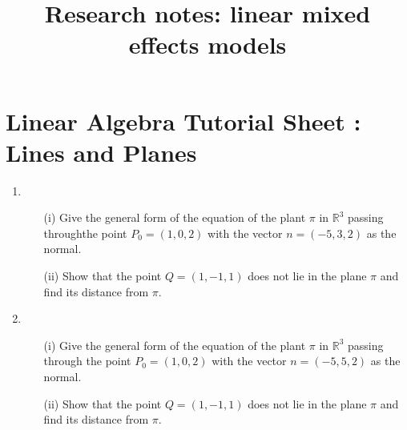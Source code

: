 \documentclass[12pt, a4paper]{report}
\title{Research notes: linear mixed effects models}
\author{ } \date{ }
\theoremstyle{plain}
\theoremstyle{definition}
\theoremstyle{remark}
\begin{document}
\section*{Linear Algebra Tutorial Sheet : Lines and Planes}
\begin{enumerate}
    \item 


\begin{itemize}
\item[(i)]  Give the general form of the equation of the plant $\pi$ in $\mathbb{R}^3$ passing throughthe point $P_0 =(1,0,2)$ with the vector $n=(-5,3,2)$ as the normal.


\item[(ii)]  Show that the point $Q=(1,-1,1)$ does not lie in the plane $\pi$ and find its distance from $\pi$.
\end{itemize}

\item
\begin{itemize}
\item[(i)]  Give the general form of the equation of the plant $\pi$ in $\mathbb{R}^3$ passing through the point $P_0 =(1,0,2)$ with the vector $n=(-5,5,2)$ as the normal.


\item[(ii)]  Show that the point $Q=(1,-1,1)$ does not lie in the plane $\pi$ and find its distance from $\pi$.
\end{itemize}

%



%


\end{enumerate}
\end{document}
